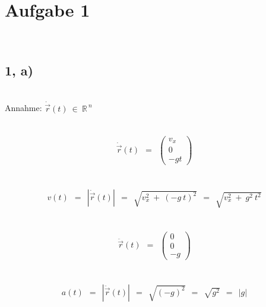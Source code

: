 \newpage


~\\


\section*{Aufgabe 1}


~\\


\subsection*{1, a)}

~\\

Annahme: \qquad $\dot{\vec{r}}(t) ~ \in ~ \mathbb{R}^{ ~ n}$

~\\

\begin{align*}
	\dot{\vec{r}}(t) ~~ = ~~ \left( \begin{array}{c} v_x \\ 0 \\ -gt \end{array} \right)
\end{align*}

~\\

\begin{align*}
	v(t) ~~ = ~~ \left| \dot{\vec{r}}(t) \right| ~~ = ~~ \sqrt{ v_x^2 ~ + ~ \left( -g ~ t \right)^2 } ~~ = ~~ \sqrt{ v_x^2 ~ + ~ g^2 ~ t^2 }
\end{align*}

~\\

\begin{align*}
\ddot{\vec{r}}(t) ~~ = ~~ \left( \begin{array}{c} 0 \\ 0 \\ -g \end{array} \right)
\end{align*}

~\\

\begin{align*}
a(t) ~~ = ~~ \left| \ddot{\vec{r}}(t) \right| ~~ = ~~ \sqrt{  \left( -g \right)^2 } ~~ = ~~ \sqrt{ g^2 } ~~ = ~~ \left| g \right|
\end{align*}

~\\
~\\

